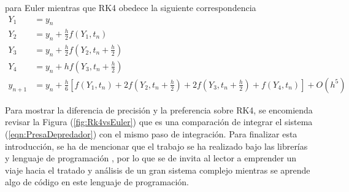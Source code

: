 para Euler mientras que RK4 obedece la siguiente correspondencia
\begin{equation}\label{eqn:RK4}
	\begin{split}
		Y_1 &= y_n\\
		Y_2 &= y_n+\frac{h}{2}f(Y_1,t_n)\\
		Y_3 &= y_n+\frac{h}{2}f\left (Y_2,t_n+\frac{h}{2}\right )\\
		Y_4 &= y_n+hf\left (Y_3,t_n+\frac{h}{2}\right )\\
		y_{n+1} &= y_n+\frac{h}{6}\left [f(Y_1,t_n)+2f\left (Y_2,t_n+\frac{h}{2}\right)+ 2f\left (Y_3,t_n+\frac{h}{2}\right )+f(Y_4,t_n)\right ]+O(h^5)
	\end{split}
\end{equation}

Para mostrar la diferencia de precisión y la preferencia sobre RK4, se encomienda revisar la Figura (\ref{fig:Rk4vsEuler}) que es una comparación de integrar el sistema (\ref{eqn:PresaDepredador}) con el mismo paso de integración. Para finalizar esta introducción, se ha de mencionar que el trabajo se ha realizado bajo las librerías y lenguaje de programación \julia, por lo que se de invita al lector a emprender un viaje hacia el tratado y análisis de un gran sistema complejo mientras se aprende algo de código en este lenguaje de programación.

 

